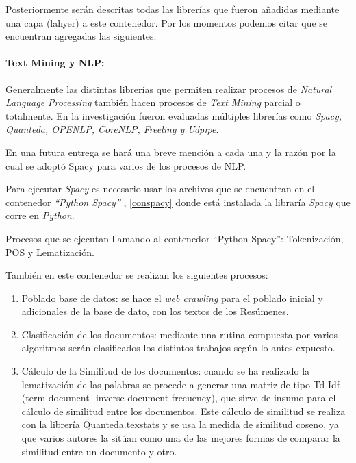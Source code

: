 \documentclass[
  10,
  openany]{book}
\begin{document}
Posteriormente serán descritas todas las librerías que fueron añadidas mediante una capa (lahyer) a este contenedor. Por los momentos podemos citar que se encuentran agregadas las siguientes:

\hypertarget{text-mining-y-nlp}{%
\paragraph{Text Mining y NLP:}\label{text-mining-y-nlp}}

Generalmente las distintas librerías que permiten realizar procesos de \emph{Natural Language Processing} también hacen procesos de \emph{Text Mining} parcial o totalmente. En la investigación fueron evaluadas múltiples librerías como \emph{Spacy, Quanteda, OPENLP, CoreNLP, Freeling y Udpipe}.

En una futura entrega se hará una breve mención a cada una y la razón por la cual se adoptó Spacy para varios de los procesos de NLP.

Para ejecutar \emph{Spacy} es necesario usar los archivos que se encuentran en el contenedor \emph{``Python Spacy''} , \ref{conspacy} donde está instalada la libraría \emph{Spacy} que corre en \emph{Python}.

Procesos que se ejecutan llamando al contenedor ``Python Spacy'': Tokenización, POS y Lematización.

También en este contenedor se realizan los siguientes procesos:

\begin{enumerate}
\def\labelenumi{\arabic{enumi}.}
\item
  Poblado base de datos: se hace el \emph{web crawling} para el poblado inicial y adicionales de la base de dato, con los textos de los Resúmenes.
\item
  Clasificación de los documentos: mediante una rutina compuesta por varios algoritmos serán clasificados los distintos trabajos según lo antes expuesto.
\item
  Cálculo de la Similitud de los documentos: cuando se ha realizado la lematización de las palabras se procede a generar una matriz de tipo Td-Idf (term document- inverse document frecuency), que sirve de insumo para el cálculo de similitud entre los documentos. Este cálculo de similitud se realiza con la librería Quanteda.texstats y se usa la medida de similitud coseno, ya que varios autores la sitúan como una de las mejores formas de comparar la similitud entre un documento y otro.
\end{enumerate}
\end{document}
